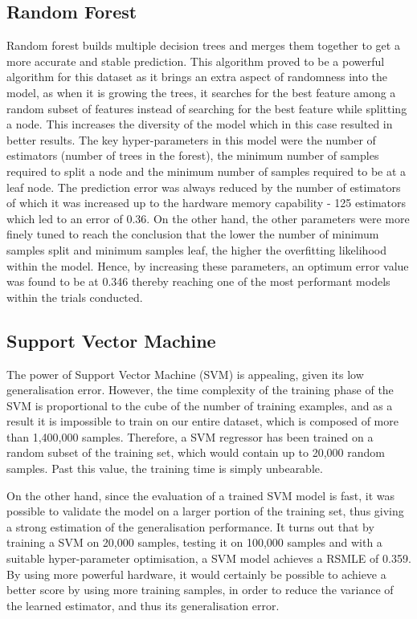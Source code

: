 \documentclass[a4paper]{article}
\begin{document}
\subsection{Random Forest}
Random forest builds multiple decision trees and merges them together to get a
more accurate and stable prediction. This algorithm proved to be a powerful
algorithm for this dataset as it brings an extra aspect of randomness into the
model, as when it is growing the trees, it searches for the best feature among a
random subset of features instead of searching for the best feature while
splitting a node. This increases the diversity of the model which in this case
resulted in better results. The key hyper-parameters in this model were the
number of estimators (number of trees in the forest), the minimum number of
samples required to split a node and the minimum number of samples required to
be at a leaf node. The prediction error was always reduced by the number of
estimators of which it was increased up to the hardware memory capability - 125
estimators which led to an error of 0.36. On the other hand, the other
parameters were more finely tuned to reach the conclusion that the lower the
number of minimum samples split and minimum samples leaf, the higher the
overfitting likelihood within the model. Hence, by increasing these parameters,
an optimum error value was found to be at 0.346 thereby reaching one of the most
performant models within the trials conducted.

\subsection{Support Vector Machine}
The power of Support Vector Machine (SVM) is appealing, given its low
generalisation error. However, the time complexity of the training phase of the
SVM is proportional to the cube of the number of training examples, and as a
result it is impossible to train on our entire dataset, which is composed of
more than 1,400,000 samples. Therefore, a SVM regressor has been trained on a
random subset of the training set, which would contain up to 20,000 random
samples. Past this value, the training time is simply unbearable.

On the other hand, since the evaluation of a trained SVM model is fast, it was
possible to validate the model on a larger portion of the training set, thus
giving a strong estimation of the generalisation performance. It turns out that
by training a SVM on 20,000 samples, testing it on 100,000 samples and with a
suitable hyper-parameter optimisation, a SVM model achieves a RSMLE of 0.359. By
using more powerful hardware, it would certainly be possible to achieve a
better score by using more training samples, in order to reduce the variance of
the learned estimator, and thus its generalisation error.
\end{document}
